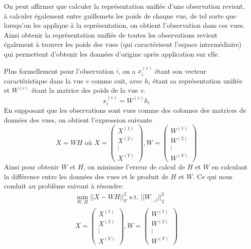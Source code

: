 \documentclass[12pt, french, latin.medieval, a4paper]{report}
\begin{document}
    On peut affirmer que calculer la représentation unifiée d'une observation revient, à calculer également entre guillemets les poids de chaque vue, de tel sorte que lorsqu'on les applique à la représentation, on obtient l'observation dans ces vues.
    Ainsi obtenir la représentation unifiée de toutes les observations revient également à trouver les poids des vues (qui caractérisent l'espace intermédiaire) qui permettent d'obtenir les données d'origine après application sur elle.

    Plus formellement pour l'observation $i$, on a $x_i^{(v)}$ étant son vecteur caractéristique dans la vue $v$ comme suit, avec $h_i$ étant sa représentation unifiée et $W^{(v)}$ étant la matrice des poids de la vue $v$.
    \begin{equation*}
   	 x_i^{(v)} = W^{(v)} h_i
    \end{equation*}
    En supposant que les observations sont vues comme des colonnes des matrices de données des vues, on obtient l'expression suivante
    \begin{equation*}
   	 X = WH \text{ où } X = \begin{pmatrix} X^{(1)}\\X^{(2)}\\\vdots\\X^{(V)} \end{pmatrix}, W = \begin{pmatrix} W^{(1)}\\W^{(2)}\\\vdots\\W^{(V)}\end{pmatrix}
    \end{equation*}
    Ainsi pour obtenir $W$ et $H$, on minimise l'erreur de calcul de $H$ et $W$ en calculant la différence entre les données des vues et le produit de $H$ et $W$.
    Ce qui nous conduit au problème suivant à résoudre:
    \begin{equation}
   	 \begin{aligned}
   		 \min_{W,H} {|| X - WH ||}_F^2 \text{  s.t. ${|| W_{:,j} ||}_2^2$} \\
   		 X = \begin{pmatrix} X^{(1)}\\X^{(2)}\\\vdots\\X^{(V)} \end{pmatrix}, W = \begin{pmatrix} W^{(1)}\\W^{(2)}\\\vdots\\W^{(V)}\end{pmatrix}
   	 \end{aligned}
   	 \label{equa:mcles3}
    \end{equation}
\end{document}
